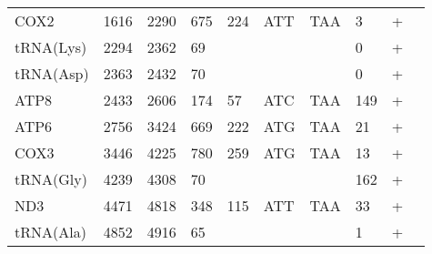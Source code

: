 \documentclass[../DISSERTACAO_MAIN.tex]{subfiles}
\begin{document}
\begin{longtable}{llllllllllllllllllllll}
			COX2         & 1616           & \multicolumn{2}{l}{2290}  & \multicolumn{2}{l}{675}        & \multicolumn{2}{l}{224}       & \multicolumn{3}{l}{ATT}                 & \multicolumn{3}{l}{TAA}   & \multicolumn{3}{l}{3}          & \multicolumn{3}{l}{+}      & \multicolumn{2}{l}{} \\
			tRNA(Lys)    & 2294           & \multicolumn{2}{l}{2362}  & \multicolumn{2}{l}{69}         & \multicolumn{2}{l}{}          & \multicolumn{3}{l}{}                    & \multicolumn{3}{l}{}      & \multicolumn{3}{l}{0}          & \multicolumn{3}{l}{+}      & \multicolumn{2}{l}{} \\
			tRNA(Asp)    & 2363           & \multicolumn{2}{l}{2432}  & \multicolumn{2}{l}{70}         & \multicolumn{2}{l}{}          & \multicolumn{3}{l}{}                    & \multicolumn{3}{l}{}      & \multicolumn{3}{l}{0}          & \multicolumn{3}{l}{+}      & \multicolumn{2}{l}{} \\
			ATP8         & 2433           & \multicolumn{2}{l}{2606}  & \multicolumn{2}{l}{174}        & \multicolumn{2}{l}{57}        & \multicolumn{3}{l}{ATC}                 & \multicolumn{3}{l}{TAA}   & \multicolumn{3}{l}{149}        & \multicolumn{3}{l}{+}      & \multicolumn{2}{l}{} \\
			ATP6         & 2756           & \multicolumn{2}{l}{3424}  & \multicolumn{2}{l}{669}        & \multicolumn{2}{l}{222}       & \multicolumn{3}{l}{ATG}                 & \multicolumn{3}{l}{TAA}   & \multicolumn{3}{l}{21}         & \multicolumn{3}{l}{+}      & \multicolumn{2}{l}{} \\
			COX3         & 3446           & \multicolumn{2}{l}{4225}  & \multicolumn{2}{l}{780}        & \multicolumn{2}{l}{259}       & \multicolumn{3}{l}{ATG}                 & \multicolumn{3}{l}{TAA}   & \multicolumn{3}{l}{13}         & \multicolumn{3}{l}{+}      & \multicolumn{2}{l}{} \\
			tRNA(Gly)    & 4239           & \multicolumn{2}{l}{4308}  & \multicolumn{2}{l}{70}         & \multicolumn{2}{l}{}          & \multicolumn{3}{l}{}                    & \multicolumn{3}{l}{}      & \multicolumn{3}{l}{162}        & \multicolumn{3}{l}{+}      & \multicolumn{2}{l}{} \\
			ND3          & 4471           & \multicolumn{2}{l}{4818}  & \multicolumn{2}{l}{348}        & \multicolumn{2}{l}{115}       & \multicolumn{3}{l}{ATT}                 & \multicolumn{3}{l}{TAA}   & \multicolumn{3}{l}{33}         & \multicolumn{3}{l}{+}      & \multicolumn{2}{l}{} \\
			tRNA(Ala)    & 4852           & \multicolumn{2}{l}{4916}  & \multicolumn{2}{l}{65}         & \multicolumn{2}{l}{}          & \multicolumn{3}{l}{}                    & \multicolumn{3}{l}{}      & \multicolumn{3}{l}{1}          & \multicolumn{3}{l}{+}      & \multicolumn{2}{l}{} \\

\end{longtable}
\end{document}
